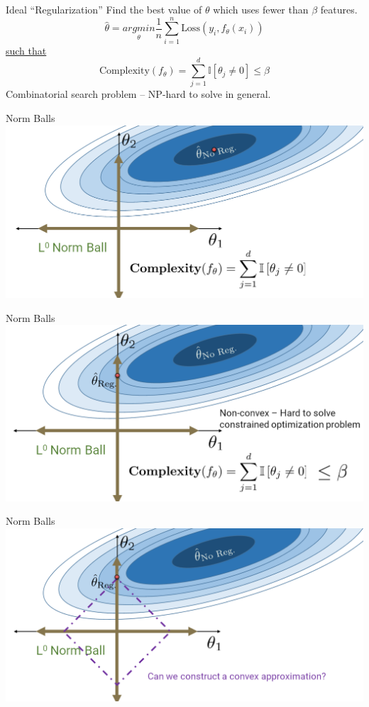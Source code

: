 \documentclass[aspectratio=169]{../latex_main/tntbeamer}  %
\begin{document}
	
	\begin{frame}[c]{Ideal “Regularization”}
	Find the best value of $\theta$ which uses fewer than $\beta$ features.
	  \begin{equation*}
	        \hat{\theta} = \underset{\theta}{arg min} \frac{1}{n}\sum\limits_{i=1}^n\text{Loss}(y_i,f_\theta(x_i))
	    \end{equation*}
	    \underline{such that}
	    \begin{equation*}
                \text{Complexity}(f_\theta) = \sum\limits_{j=1}^d\mathbb{I}[\theta_j \neq 0] \leq \beta
        \end{equation*}
        Combinatorial search problem – NP-hard to solve in general.

	\end{frame}
	
	
	\begin{frame}{Norm Balls}
	    \includegraphics[scale=.35]{Bild5}
	\end{frame}
	
	\begin{frame}{Norm Balls}
	    \includegraphics[scale=.35]{Bild6}
	\end{frame}
	
	\begin{frame}{Norm Balls}
	    \includegraphics[scale=.35]{Bild7}
	\end{frame}
	
\end{document}
